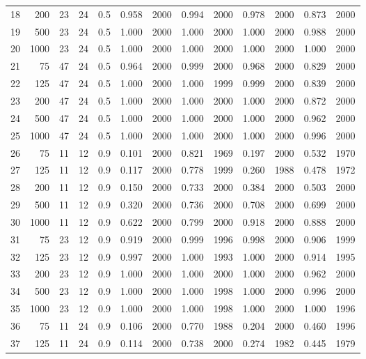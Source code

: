 \documentclass{article}
\begin{document}
\begin{table}[ht]
\begin{center}
\begin{tabular}{rrrrrrrrrrrrr}
  18 & 200 & 23 & 24 & 0.5 & 0.958 & 2000 & 0.994 & 2000 & 0.978 & 2000 & 0.873 & 2000 \\ 
  19 & 500 & 23 & 24 & 0.5 & 1.000 & 2000 & 1.000 & 2000 & 1.000 & 2000 & 0.988 & 2000 \\ 
  20 & 1000 & 23 & 24 & 0.5 & 1.000 & 2000 & 1.000 & 2000 & 1.000 & 2000 & 1.000 & 2000 \\ 
   \hline
21 & 75 & 47 & 24 & 0.5 & 0.964 & 2000 & 0.999 & 2000 & 0.968 & 2000 & 0.829 & 2000 \\ 
  22 & 125 & 47 & 24 & 0.5 & 1.000 & 2000 & 1.000 & 1999 & 0.999 & 2000 & 0.839 & 2000 \\ 
  23 & 200 & 47 & 24 & 0.5 & 1.000 & 2000 & 1.000 & 2000 & 1.000 & 2000 & 0.872 & 2000 \\ 
  24 & 500 & 47 & 24 & 0.5 & 1.000 & 2000 & 1.000 & 2000 & 1.000 & 2000 & 0.962 & 2000 \\ 
  25 & 1000 & 47 & 24 & 0.5 & 1.000 & 2000 & 1.000 & 2000 & 1.000 & 2000 & 0.996 & 2000 \\ 
   \hline
26 & 75 & 11 & 12 & 0.9 & 0.101 & 2000 & 0.821 & 1969 & 0.197 & 2000 & 0.532 & 1970 \\ 
  27 & 125 & 11 & 12 & 0.9 & 0.117 & 2000 & 0.778 & 1999 & 0.260 & 1988 & 0.478 & 1972 \\ 
  28 & 200 & 11 & 12 & 0.9 & 0.150 & 2000 & 0.733 & 2000 & 0.384 & 2000 & 0.503 & 2000 \\ 
  29 & 500 & 11 & 12 & 0.9 & 0.320 & 2000 & 0.736 & 2000 & 0.708 & 2000 & 0.699 & 2000 \\ 
  30 & 1000 & 11 & 12 & 0.9 & 0.622 & 2000 & 0.799 & 2000 & 0.918 & 2000 & 0.888 & 2000 \\ 
   \hline
31 & 75 & 23 & 12 & 0.9 & 0.919 & 2000 & 0.999 & 1996 & 0.998 & 2000 & 0.906 & 1999 \\ 
  32 & 125 & 23 & 12 & 0.9 & 0.997 & 2000 & 1.000 & 1993 & 1.000 & 2000 & 0.914 & 1995 \\ 
  33 & 200 & 23 & 12 & 0.9 & 1.000 & 2000 & 1.000 & 2000 & 1.000 & 2000 & 0.962 & 2000 \\ 
  34 & 500 & 23 & 12 & 0.9 & 1.000 & 2000 & 1.000 & 1998 & 1.000 & 2000 & 0.996 & 2000 \\ 
  35 & 1000 & 23 & 12 & 0.9 & 1.000 & 2000 & 1.000 & 1998 & 1.000 & 2000 & 1.000 & 1996 \\ 
   \hline
36 & 75 & 11 & 24 & 0.9 & 0.106 & 2000 & 0.770 & 1988 & 0.204 & 2000 & 0.460 & 1996 \\ 
  37 & 125 & 11 & 24 & 0.9 & 0.114 & 2000 & 0.738 & 2000 & 0.274 & 1982 & 0.445 & 1979 \\ 

\end{tabular}
\end{center}
\end{table}
\end{document}
